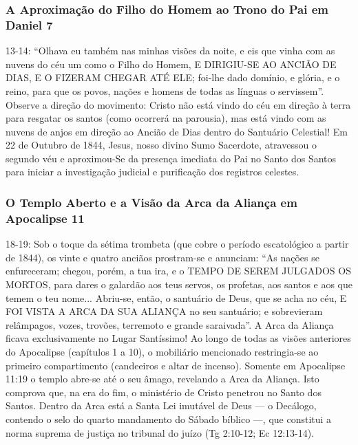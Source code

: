 \documentclass[11pt,a4paper,openany]{book}
\begin{document}
\subsubsection*{A Aproximação do Filho do Homem ao Trono do Pai em Daniel 7}
13-14:
``Olhava eu também nas minhas visões da noite, e eis que vinha com as nuvens do céu um como o Filho do Homem, E DIRIGIU-SE AO ANCIÃO DE DIAS, E O FIZERAM CHEGAR ATÉ ELE; foi-lhe dado domínio, e glória, e o reino, para que os povos, nações e homens de todas as línguas o servissem''.
Observe a direção do movimento: Cristo não está vindo do céu em direção à terra para resgatar os santos (como ocorrerá na parousia), mas está vindo com as nuvens de anjos em direção ao Ancião de Dias dentro do Santuário Celestial! Em 22 de Outubro de 1844, Jesus, nosso divino Sumo Sacerdote, atravessou o segundo véu e aproximou-Se da presença imediata do Pai no Santo dos Santos para iniciar a investigação judicial e purificação dos registros celestes.


\subsubsection*{O Templo Aberto e a Visão da Arca da Aliança em Apocalipse 11}
18-19:
Sob o toque da sétima trombeta (que cobre o período escatológico a partir de 1844), os vinte e quatro anciãos prostram-se e anunciam: ``As nações se enfureceram; chegou, porém, a tua ira, e o TEMPO DE SEREM JULGADOS OS MORTOS, para dares o galardão aos teus servos, os profetas, aos santos e aos que temem o teu nome... Abriu-se, então, o santuário de Deus, que se acha no céu, E FOI VISTA A ARCA DA SUA ALIANÇA no seu santuário; e sobrevieram relâmpagos, vozes, trovões, terremoto e grande saraivada''.
A Arca da Aliança ficava exclusivamente no Lugar Santíssimo! Ao longo de todas as visões anteriores do Apocalipse (capítulos 1 a 10), o mobiliário mencionado restringia-se ao primeiro compartimento (candeeiros e altar de incenso). Somente em Apocalipse 11:19 o templo abre-se até o seu âmago, revelando a Arca da Aliança. Isto comprova que, na era do fim, o ministério de Cristo penetrou no Santo dos Santos. Dentro da Arca está a Santa Lei imutável de Deus — o Decálogo, contendo o selo do quarto mandamento do Sábado bíblico —, que constitui a norma suprema de justiça no tribunal do juízo (Tg 2:10-12; Ec 12:13-14).
\end{document}
